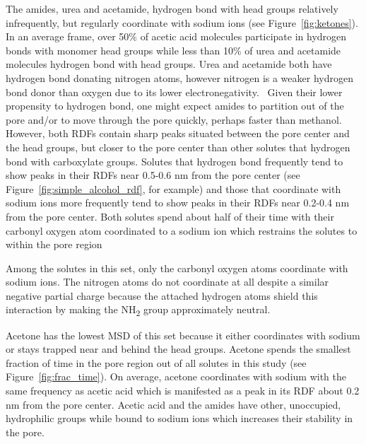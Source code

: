 \documentclass[journal=jpcbfk,manuscript=article]{achemso}
\begin{document}
  The amides, urea and acetamide, hydrogen bond with head groups relatively 
  infrequently, but regularly coordinate with sodium ions (see 
  Figure~\ref{fig:ketones}). In an average frame, over 50\% of acetic acid molecules
  participate in hydrogen bonds with monomer head groups while less than 
  10\% of urea and acetamide molecules hydrogen bond with head groups. 
  Urea and acetamide both have hydrogen bond donating nitrogen atoms, however
  nitrogen is a weaker hydrogen bond donor than oxygen due to its lower 
  electronegativity.~\cite{biswal_hydrogen_2015} Given their lower propensity
  to hydrogen bond, one might expect amides to partition out of the pore 
  and/or to move through the pore quickly, perhaps faster than methanol. 
  However, both RDFs contain sharp peaks situated between the pore center
  and the head groups, but closer to the pore center than other solutes 
  that hydrogen bond with carboxylate groups. Solutes that
  hydrogen bond frequently tend to show peaks in their RDFs near 0.5-0.6 nm 
  from the pore center (see Figure~\ref{fig:simple_alcohol_rdf}, for example)
  and those that coordinate with sodium ions more frequently tend to show 
  peaks in their RDFs near 0.2-0.4 nm from the pore center. Both solutes spend
  about half of their time with their carbonyl oxygen atom coordinated to a
  sodium ion which restrains the solutes to within the pore region
  
  Among the solutes in this set, only the carbonyl oxygen atoms coordinate 
  with sodium ions. The nitrogen atoms do not coordinate at all despite a
  similar negative partial charge because the attached hydrogen atoms 
  shield this interaction by making the NH\textsubscript{2} group 
  approximately neutral.

  Acetone has the lowest MSD of this set because it either coordinates with
  sodium or stays trapped near and behind the head groups. Acetone spends the
  smallest fraction of time in the pore region out of all solutes in this study
  (see Figure~\ref{fig:frac_time}). On average, acetone coordinates with sodium
  with the same frequency as acetic acid which is manifested as a peak in its 
  RDF about 0.2 nm from the pore center. 
  Acetic acid and the amides have other, unoccupied, hydrophilic groups while
  bound to sodium ions which increases their stability in the pore.
  
\end{document}
